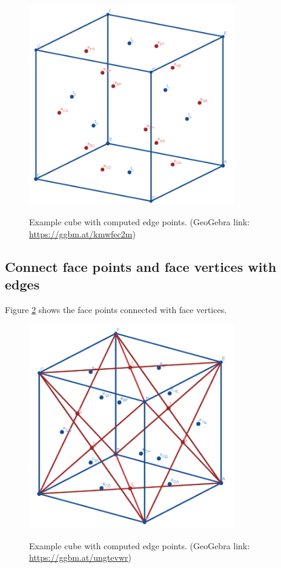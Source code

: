 \documentclass{article}
\begin{document}
\begin{figure}[H]
\caption{Example cube with computed edge points. (GeoGebra link: \href{https://ggbm.at/kmwfec2m}{https://ggbm.at/kmwfec2m})}
\centering
\includegraphics[width=0.8\textwidth]{images/cl-03.png}
\label{fig:cube3}
\end{figure}
\subsection{Connect face points and face vertices with edges}
Figure \ref{fig:cube4} shows the face points connected with face vertices.
\begin{figure}[H]
\caption{Example cube with computed edge points. (GeoGebra link: \href{https://ggbm.at/ungtevwr}{https://ggbm.at/ungtevwr})}
\centering
\includegraphics[width=0.8\textwidth]{images/cl-04.png}
\label{fig:cube4}
\end{figure}
\end{document}

